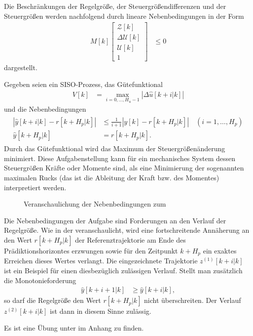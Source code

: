 Die Beschränkungen der Regelgröße, der Steuergrößendifferenzen und der Steuergrößen werden nachfolgend durch lineare Nebenbedingungen in der Form
\begin{align}
M[k]\begin{bmatrix}
\mathcal{Z}[k]\\ \Delta\mathcal{U}[k]\\ \mathcal{U}[k]\\ 1
\end{bmatrix} & \le 0	\label{eqn:kap_4_lin_nebenbedingungen}
\end{align}
dargestellt.
\begin{exmp}
Gegeben seien ein \ac{SISO}-Prozess, das Gütefunktional
\begin{align*}
	V[k] & = \max\limits_{i=0,\ldots,H_u-1}\left|\Delta\hat{u}[k+i|k] \right|
\end{align*}
und die Nebenbedingungen
\begin{align}
\begin{split}\label{eqn:kap_4_bsp_1_nebenbedingungen}
	\left|\hat{y}[k+i|k]-r[k+H_p|k] \right| & \le \frac{1}{i+1}\left| y[k] - r[k+H_p|k] \right|\quad (i=1,\ldots,H_p)\\
	\hat{y}[k+H_p|k] & = r[k+H_p|k].
\end{split}
\end{align}
Durch das Gütefunktional wird das Maximum der Steuergrößenänderung minimiert. Diese Aufgabenstellung kann für ein mechanisches System dessen Steuergrößen Kräfte oder Momente sind, als
eine Minimierung der sogenannten maximalen Rucks (das ist die Ableitung der Kraft bzw. des Momentes) interpretiert werden.
\begin{figure}[htb]
	\centering
	
	\caption{Veranschaulichung der Nebenbedingungen zum }
	\label{fig:kap_4_bsp_nebenbedingungen}
\end{figure}
Die Nebenbedingungen der Aufgabe sind Forderungen an den Verlauf der Regelgröße. Wie in der  veranschaulicht, wird eine fortschreitende Annäherung
an den Wert $r[k+H_p|k]$ der Referenztrajektorie am Ende des Prädiktionshorizontes erzwungen sowie für den Zeitpunkt $k+H_p$ ein exaktes Erreichen dieses Wertes verlangt. Die
eingezeichnete Trajektorie $z^{(1)}[k+i|k]$ ist ein Beispiel für einen diesbezüglich zulässigen Verlauf. Stellt man zusätzlich die Monotonieforderung
\begin{align}
	\hat{y}[k+i+1|k] & \ge \hat{y}[k+i|k], \label{eqn:kap_4_monotonie_anf}
\end{align}
so darf die Regelgröße den Wert $r[k+H_p|k]$ nicht überschreiten. Der Verlauf $z^{(2)}[k+i|k]$ ist dann in diesem Sinne zulässig.
\end{exmp}
Es ist eine Übung unter  im Anhang zu finden.

